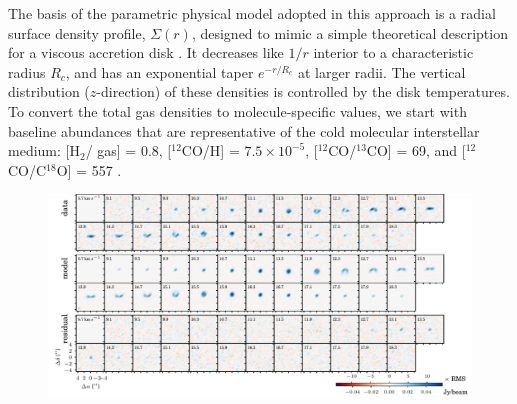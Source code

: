 \documentclass[twocolumn]{aastex61}
\begin{document}
The basis of the parametric physical model adopted in this approach is a radial surface density profile, $\Sigma(r)$, designed to mimic a simple theoretical description for a viscous accretion disk \citep{lyndenbell74,hartmann98}.  It decreases like $1/r$ interior to a characteristic radius $R_c$, and has an exponential taper $e^{-r/R_c}$ at larger radii.  The vertical distribution ($z$-direction) of these densities is controlled by the disk temperatures. To convert the total gas densities to molecule-specific values, we start with baseline abundances that are representative of the cold molecular interstellar medium: [H$_2$/ gas] = 0.8, [$^{12}$CO/H] = $7.5 \times 10^{-5}$, [$^{12}$CO/$^{13}$CO] = 69, and [$^{12}$CO/C$^{18}$O] = 557 \citep[e.g.,][]{henkel94,prantzos96}. 

\begin{figure}[ht!]
\begin{center}
  \includegraphics{chmaps_C18O.pdf}
  \end{center}
\end{figure}

\end{document}
